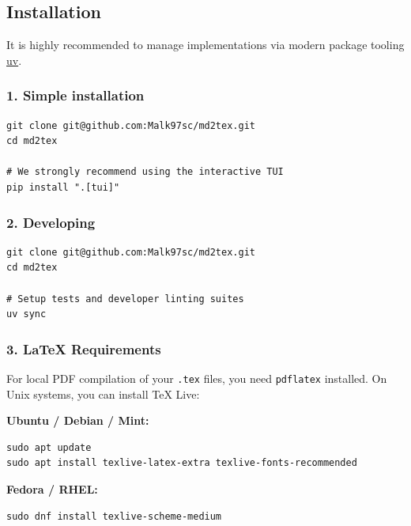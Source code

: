 \documentclass[a4paper, 12pt, twoside]{article}
\begin{document}
\subsection*{Installation}

It is highly recommended to manage implementations via modern package tooling \href{https://docs.astral.sh/uv/\#highlights}{uv}.

\subsubsection*{1. Simple installation}

\begin{lstlisting}
git clone git@github.com:Malk97sc/md2tex.git
cd md2tex

# We strongly recommend using the interactive TUI
pip install ".[tui]"
\end{lstlisting}

\subsubsection*{2. Developing}

\begin{lstlisting}
git clone git@github.com:Malk97sc/md2tex.git
cd md2tex

# Setup tests and developer linting suites
uv sync
\end{lstlisting}

\subsubsection*{3. LaTeX Requirements}

For local PDF compilation of your \texttt{.tex} files, you need \texttt{pdflatex} installed. On Unix systems, you can install TeX Live:

\noindent{}\textbf{Ubuntu / Debian / Mint:}

\begin{lstlisting}
sudo apt update
sudo apt install texlive-latex-extra texlive-fonts-recommended
\end{lstlisting}

\noindent{}\textbf{Fedora / RHEL:}

\begin{lstlisting}
sudo dnf install texlive-scheme-medium
\end{lstlisting}
\end{document}
